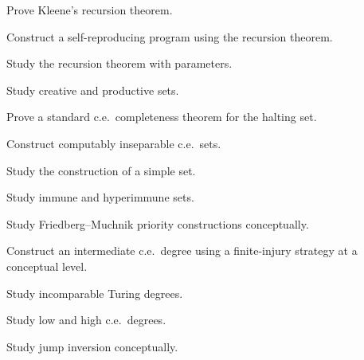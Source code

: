 \begin{exercise}[4]
Prove Kleene's recursion theorem.
\end{exercise}

\begin{exercise}[4]
Construct a self-reproducing program using the recursion theorem.
\end{exercise}

\begin{exercise}[4]
Study the recursion theorem with parameters.
\end{exercise}

\begin{exercise}[4]
Study creative and productive sets.
\end{exercise}

\begin{exercise}[4]
Prove a standard c.e.\ completeness theorem for the halting set.
\end{exercise}

\begin{exercise}[4]
Construct computably inseparable c.e.\ sets.
\end{exercise}

\begin{exercise}[4]
Study the construction of a simple set.
\end{exercise}

\begin{exercise}[4]
Study immune and hyperimmune sets.
\end{exercise}

\begin{exercise}[4]
Study Friedberg--Muchnik priority constructions conceptually.
\end{exercise}

\begin{exercise}[4]
Construct an intermediate c.e.\ degree using a finite-injury strategy at a
conceptual level.
\end{exercise}

\begin{exercise}[4]
Study incomparable Turing degrees.
\end{exercise}

\begin{exercise}[4]
Study low and high c.e.\ degrees.
\end{exercise}

\begin{exercise}[4]
Study jump inversion conceptually.
\end{exercise}

